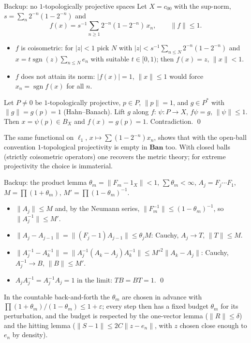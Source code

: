 \documentclass[10pt,aspectratio=169]{beamer}
\newcommand{\Ban}{\mathbf{Ban}}
\begin{document}
\begin{frame}{Backup: no $1$-topologically projective spaces}
  Let $X=c_{00}$ with the sup-norm, $s=\sum_n2^{-n}(1-2^{-n})$ and
  \[
    f(x)=s^{-1}\sum_{n\ge1}2^{-n}(1-2^{-n})\,x_n ,\qquad \|f\|\le1 .
  \]
  \begin{itemize}
    \item $f$ is coisometric: for $|z|<1$ pick $N$ with
      $|z|<s^{-1}\sum_{n\le N}2^{-n}(1-2^{-n})$ and $x=t\operatorname{sgn}(z)\sum_{n\le N}e_n$
      with suitable $t\in[0,1)$; then $f(x)=z$, $\|x\|<1$.
    \item $f$ does not attain its norm: $|f(x)|=1$, $\|x\|\le1$ would force
      $x_n=\operatorname{sgn}f(x)$ for all $n$.
  \end{itemize}
  \medskip
  Let $P\ne0$ be $1$-topologically projective, $p\in P$, $\|p\|=1$, and
  $g\in P^*$ with $\|g\|=g(p)=1$ (Hahn--Banach). Lift $g$ along $f$:
  $\psi\colon P\to X$, $f\psi=g$, $\|\psi\|\le1$. Then $x=\psi(p)\in B_X$ and
  $f(x)=g(p)=1$. Contradiction. \qed
  \medskip

  The same functional on $\ell_1$, $x\mapsto\sum(1-2^{-n})x_n$, shows that with
  the open-ball convention $1$-topological projectivity is empty in $\Ban$ too.
  With closed balls (strictly coisometric operators) one recovers the metric
  theory; for extreme projectivity the choice is immaterial.
\end{frame}

\begin{frame}{Backup: the product lemma}
  $\theta_m=\|F_m-1_X\|<1$, $\sum\theta_m<\infty$, $A_j=F_j\cdots F_1$,
  $M=\prod(1+\theta_m)$, $M'=\prod{(1-\theta_m)}^{-1}$.
  \begin{itemize}
    \item $\|A_j\|\le M$ and, by the Neumann series, $\|F_m^{-1}\|\le{(1-\theta_m)}^{-1}$,
      so $\|A_j^{-1}\|\le M'$.
    \item $\|A_j-A_{j-1}\|=\|(F_j-1)A_{j-1}\|\le\theta_jM$: Cauchy, $A_j\to T$, $\|T\|\le M$.
    \item $\|A_j^{-1}-A_k^{-1}\|=\|A_j^{-1}(A_k-A_j)A_k^{-1}\|\le{M'}^2\|A_k-A_j\|$:
      Cauchy, $A_j^{-1}\to B$, $\|B\|\le M'$.
    \item $A_jA_j^{-1}=A_j^{-1}A_j=1$ in the limit: $TB=BT=1$. \qed
  \end{itemize}
  \medskip
  In the countable back-and-forth the $\theta_m$ are chosen in advance with
  $\prod(1+\theta_m)/(1-\theta_m)\le1+\varepsilon$; every step then has a fixed
  budget $\theta_m$ for its perturbation, and the budget is respected by the
  one-vector lemma ($\|R\|\le\delta$) and the hitting lemma ($\|S-1\|\le2C\|z-e_n\|$,
  with $z$ chosen close enough to $e_n$ by density).
\end{frame}
\end{document}
